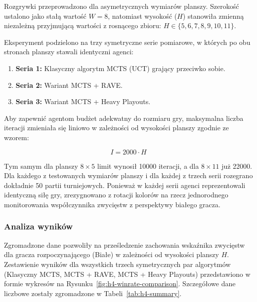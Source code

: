 \documentclass{article}
\begin{document}
Rozgrywki przeprowadzono dla asymetrycznych wymiarów planszy. Szerokość ustalono jako stałą wartość $W = 8$, natomiast wysokość ($H$) stanowiła zmienną niezależną przyjmującą wartości z rosnącego zbioru: $H \in \{5, 6, 7, 8, 9, 10, 11\}$. 

Eksperyment podzielono na trzy symetryczne serie pomiarowe, w których po obu stronach planszy stawali identyczni agenci:
\begin{enumerate}
    \item \textbf{Seria 1:} Klasyczny algorytm MCTS (UCT) grający przeciwko sobie.
    \item \textbf{Seria 2:} Wariant MCTS + RAVE.
    \item \textbf{Seria 3:} Wariant MCTS + Heavy Playouts.
\end{enumerate}

\noindent
Aby zapewnić agentom budżet adekwatny do rozmiaru gry, maksymalna liczba iteracji zmieniała się liniowo w zależności od wysokości planszy zgodnie ze wzorem:

$$I = 2000 \cdot H$$

\noindent
Tym samym dla planszy $8 \times 5$ limit wynosił 10000 iteracji, a dla $8 \times 11$ już 22000. \\

\noindent
Dla każdego z testowanych wymiarów planszy i dla każdej z trzech serii rozegrano dokładnie 50 partii turniejowych. Ponieważ w każdej serii agenci reprezentowali identyczną siłę gry, zrezygnowano z rotacji kolorów na rzecz jednorodnego monitorowania współczynnika zwycięstw z perspektywy białego gracza.

\subsubsection{Analiza wyników}

Zgromadzone dane pozwoliły na prześledzenie zachowania wskaźnika zwycięstw dla gracza rozpoczynającego (Białe) w zależności od wysokości planszy $H$. Zestawienie wyników dla wszystkich trzech symetrycznych par algorytmów (Klasyczny MCTS, MCTS + RAVE, MCTS + Heavy Playouts) przedstawiono w formie wykresów na Rysunku~\ref{fig:h4-winrate-comparison}. Szczegółowe dane liczbowe zostały zgromadzone w Tabeli~\ref{tab:h4-summary}.
\end{document}
